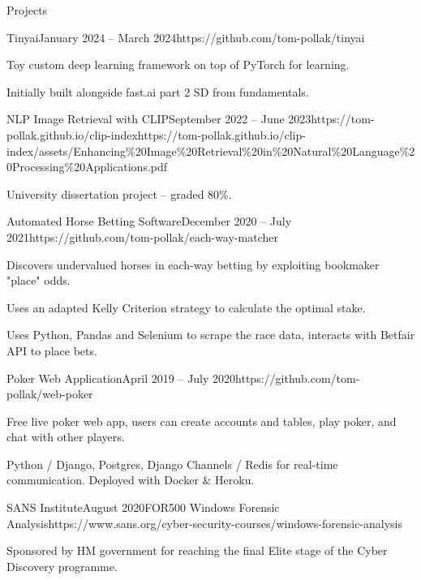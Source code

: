 \documentclass{structure}
\begin{document}
\begin{rSection}{Projects}

    \begin{rSubsection}{Tinyai}{January 2024 -- March 2024}{}{}{https://github.com/tom-pollak/tinyai}{}
        \item Toy custom deep learning framework on top of PyTorch for learning.
        \item Initially built alongside fast.ai part 2 SD from fundamentals.
    \end{rSubsection}

    \begin{rSubsection}{NLP Image Retrieval with CLIP}{September 2022 -- June 2023}{}{}{https://tom-pollak.github.io/clip-index}{https://tom-pollak.github.io/clip-index/assets/Enhancing\%20Image\%20Retrieval\%20in\%20Natural\%20Language\%20Processing\%20Applications.pdf}
        \item University dissertation project -- graded 80\%.
    \end{rSubsection}


    \begin{rSubsection}{Automated Horse Betting Software}{December 2020 -- July 2021}{}{}{https://github.com/tom-pollak/each-way-matcher}{}
        \item Discovers undervalued horses in each-way betting by exploiting bookmaker
        "place" odds.
        \item Uses an adapted Kelly Criterion strategy to calculate the optimal stake.
        \item Uses Python, Pandas and Selenium to scrape the race data, interacts with
        Betfair API to place bets.
    \end{rSubsection}

    \begin{rSubsection}{Poker Web Application}{April 2019 -- July 2020}{}{}{https://github.com/tom-pollak/web-poker}{}
        \item Free live poker web app, users can create accounts and tables, play poker, and chat with other players.
        \item Python / Django, Postgres, Django Channels / Redis for real-time communication. Deployed with Docker \& Heroku.
    \end{rSubsection}

    \begin{rSubsection}{SANS Institute}{August 2020}{FOR500 Windows Forensic Analysis}{}{https://www.sans.org/cyber-security-courses/windows-forensic-analysis}{}
        \item Sponsored by HM government for reaching the final Elite stage of the Cyber Discovery programme.
    \end{rSubsection}

\end{rSection}
\end{document}
